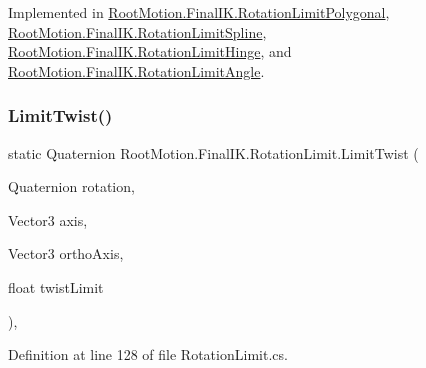 Implemented in \mbox{\hyperlink{class_root_motion_1_1_final_i_k_1_1_rotation_limit_polygonal_a6ee86a0767ca239408b3ea917dd999ac}{Root\+Motion.\+Final\+I\+K.\+Rotation\+Limit\+Polygonal}}, \mbox{\hyperlink{class_root_motion_1_1_final_i_k_1_1_rotation_limit_spline_a28eb3a624d653ab65b5b50e346787148}{Root\+Motion.\+Final\+I\+K.\+Rotation\+Limit\+Spline}}, \mbox{\hyperlink{class_root_motion_1_1_final_i_k_1_1_rotation_limit_hinge_aad677e39535e5f9344da8bfbd5bd3388}{Root\+Motion.\+Final\+I\+K.\+Rotation\+Limit\+Hinge}}, and \mbox{\hyperlink{class_root_motion_1_1_final_i_k_1_1_rotation_limit_angle_af94125b5f84e83387721d12d5f9c50aa}{Root\+Motion.\+Final\+I\+K.\+Rotation\+Limit\+Angle}}.

\mbox{\label{class_root_motion_1_1_final_i_k_1_1_rotation_limit_a6eb7d443630c5d74bd4789723d96c396}} 
\subsubsection{\texorpdfstring{Limit\+Twist()}{LimitTwist()}}
{\footnotesize\ttfamily static Quaternion Root\+Motion.\+Final\+I\+K.\+Rotation\+Limit.\+Limit\+Twist (\begin{DoxyParamCaption}\item[{Quaternion}]{rotation,  }\item[{Vector3}]{axis,  }\item[{Vector3}]{ortho\+Axis,  }\item[{float}]{twist\+Limit }\end{DoxyParamCaption})\hspace{0.3cm}{\ttfamily [static]}, {\ttfamily [protected]}}



Definition at line 128 of file Rotation\+Limit.\+cs.

\mbox{\label{class_root_motion_1_1_final_i_k_1_1_rotation_limit_aba2c93debdd5f53a0169d0067a6c1454}} 
